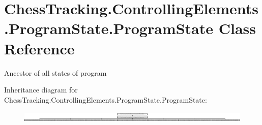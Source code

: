 \hypertarget{class_chess_tracking_1_1_controlling_elements_1_1_program_state_1_1_program_state}{}\section{Chess\+Tracking.\+Controlling\+Elements.\+Program\+State.\+Program\+State Class Reference}
\label{class_chess_tracking_1_1_controlling_elements_1_1_program_state_1_1_program_state}


Ancestor of all states of program  


Inheritance diagram for Chess\+Tracking.\+Controlling\+Elements.\+Program\+State.\+Program\+State\+:\begin{figure}[H]
\begin{center}
\leavevmode
\includegraphics[height=0.518359cm]{class_chess_tracking_1_1_controlling_elements_1_1_program_state_1_1_program_state}
\end{center}
\end{figure}
